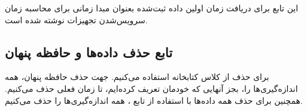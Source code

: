 این تابع برای دریافت زمان اولین داده ثبت‌شده بعنوان مبدا زمانی برای محاسبه زمان سرویس‌شدن تجهیزات نوشته شده است.

\subsection{تابع حذف داده‌ها و حافظه پنهان}

برای حذف از کلاس  کتابخانه استفاده می‌کنیم. جهت حذف حافظه پنهان، همه اندازه‌گیری‌ها را، بجز آنهایی که خودمان تعریف کرده‌ایم، تا زمان فعلی حذف می‌کنیم. همچنین برای حذف همه داده‌ها با استفاده از تابع ، همه اندازه‌گیری‌ها را حذف می‌کنیم.